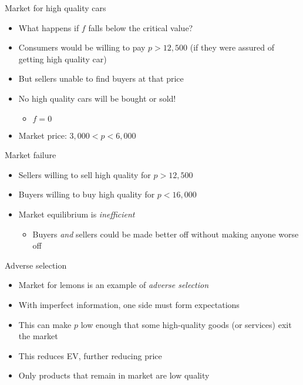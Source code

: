 \documentclass[10pt]{beamer}
\begin{document}
\begin{frame}[label={sec:org59be174}]{}
\alert{Market for high quality cars}
\begin{itemize}
\item What happens if \(f\) falls below the critical value?
\item Consumers would be willing to pay \(p>12,500\) (if they were assured of getting high quality car)
\item But sellers unable to find buyers at that price
\item No high quality cars will be bought or sold!
\begin{itemize}
\item \(f=0\)
\end{itemize}
\item Market price: \(3,000<p<6,000\)
\end{itemize}
\end{frame}

\begin{frame}[label={sec:org30540b9}]{}
\alert{Market failure}
\begin{itemize}
\item Sellers willing to sell high quality for \(p>12,500\)
\item Buyers willing to buy high quality for \(p<16,000\)
\item Market equilibrium is \emph{inefficient}
\begin{itemize}
\item Buyers \emph{and} sellers could be made better off without making anyone worse off
\end{itemize}
\end{itemize}
\end{frame}

\begin{frame}[label={sec:orgbb1bd38}]{}
\alert{Adverse selection}
\begin{itemize}
\item Market for lemons is an example of \emph{adverse selection}
\item With imperfect information, one side must form expectations
\item This can make \(p\) low enough that some high-quality goods (or services) exit the market
\item This reduces EV, further reducing price
\item Only products that remain in market are low quality
\end{itemize}
\end{frame}
\end{document}
